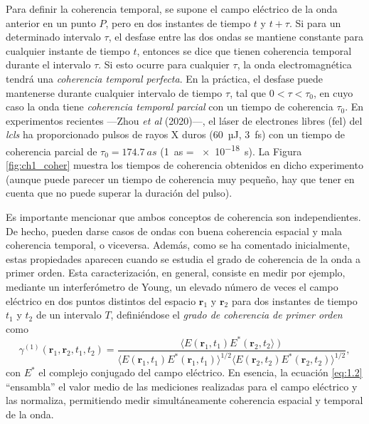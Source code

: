 Para definir la coherencia temporal, se supone el campo eléctrico de la onda anterior en un punto $P$, pero en dos instantes de tiempo $t$ y $t+\tau$. Si para un determinado intervalo $\tau$, el desfase entre las dos ondas se mantiene constante para cualquier instante de tiempo $t$, entonces se dice que tienen coherencia temporal durante el intervalo $\tau$. Si esto ocurre para cualquier $\tau$, la onda electromagnética tendrá una \emph{coherencia temporal perfecta}. En la práctica, el desfase puede mantenerse durante cualquier intervalo de tiempo $\tau$, tal que $0<\tau<\tau_0$, en cuyo caso la onda tiene \emph{coherencia temporal parcial} con un tiempo de coherencia $\tau_0$. En experimentos recientes ---Zhou \emph{et al} (2020)---\autocite{Zhou2020}, el láser de electrones libres (\acrshort{fel}) del \emph{\acrfull{lcls}} ha proporcionado pulsos de rayos X duros (\qty{60}{µJ}, \qty{3}{fs}) con un tiempo de coherencia parcial de $\tau_0 = \qty{174,7}{as}$ (\qty{1}{as} = \qty{e-18}{s}). La Figura \ref{fig:ch1_coher} muestra los tiempos de coherencia obtenidos en dicho experimento (aunque puede parecer un tiempo de coherencia muy pequeño, hay que tener en cuenta que no puede superar la duración del pulso). 

Es importante mencionar que ambos conceptos de coherencia son independientes. De hecho, pueden darse casos de ondas con buena coherencia espacial y mala coherencia temporal, o viceversa. Además, como se ha comentado inicialmente, estas propiedades aparecen cuando se estudia el grado de coherencia de la onda a primer orden. Esta caracterización, en general, consiste en medir por ejemplo, mediante un interferómetro de Young, un elevado número de veces el campo eléctrico en dos puntos distintos del espacio $\symbf{r}_1$ y $\symbf{r}_2$ para dos instantes de tiempo $t_1$ y $t_2$ de un intervalo $T$, definiéndose el \emph{grado de coherencia de primer orden} como
\begin{equation}\label{eq:1.2}
  \gamma^{(1)}(\symbf{r}_{1},\symbf{r}_{2},t_{1},t_{2}) = \frac{\langle E(\symbf{r}_{1},t_{1})E^{*}(\symbf{r}_{2},t_{2}\rangle)}{\langle E(\symbf{r}_{1},t_{1})E^{*}(\symbf{r}_{1},t_{1}) \rangle^{1/2} \langle E(\symbf{r}_{2},t_{2})E^{*}(\symbf{r}_{2},t_{2}) \rangle^{1/2}},
\end{equation}
con $E^{*}$ el complejo conjugado del campo eléctrico. En esencia, la ecuación \eqref{eq:1.2} \enquote{ensambla} el valor medio de las mediciones realizadas para el campo eléctrico y las normaliza, permitiendo medir simultáneamente coherencia espacial y temporal de la onda.

